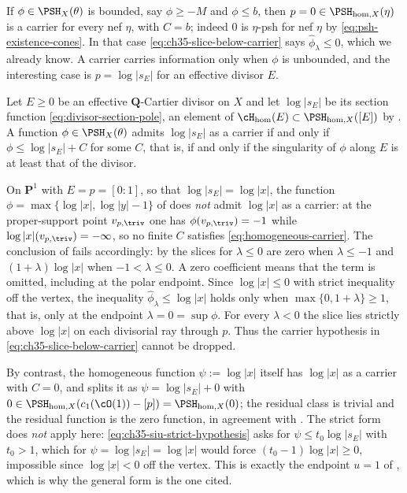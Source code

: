 \begin{example}
\label{ex:ch35-bounded-carrier}
If $\phi\in\PSH_X(\theta)$ is bounded, say $\phi\geq-M$ and
$\phi\leq b$, then $p=0\in\PSH_{\mathrm{hom},X}(\eta)$ is a carrier for
every nef $\eta$, with $C=b$; indeed $0$ is $\eta$-psh for nef
$\eta$ by \eqref{eq:psh-existence-cones}.  In that case
\eqref{eq:ch35-slice-below-carrier} says $\widehat\phi_\lambda\leq0$,
which we already know.  A carrier carries information only when $\phi$ is
unbounded, and the interesting case is $p=\log|s_E|$ for an effective
divisor $E$.
\end{example}

\begin{example}
\label{ex:ch35-divisorial-carrier}
Let $E\geq0$ be an effective $\mathbf Q$-Cartier divisor on $X$ and
let $\log|s_E|$ be its section function
\eqref{eq:divisor-section-pole}, an element of
$\cH_{\mathrm{hom}}(E)\subset\PSH_{\mathrm{hom},X}([E])$ by
.  A function
$\phi\in\PSH_X(\theta)$ admits $\log|s_E|$ as a carrier if and only if
$\phi\leq\log|s_E|+C$ for some $C$, that is, if and only if the
singularity of $\phi$ along $E$ is at least that of the divisor.

On $\mathbf P^1$ with $E=p=[0:1]$, so that $\log|s_E|=\log|x|$, the
function $\phi=\max\{\log|x|,\log|y|-1\}$ of
 does \emph{not} admit $\log|x|$ as a
carrier: at the proper-support point $v_{p,\triv}$ one has
$\phi(v_{p,\triv})=-1$ while $\log|x|(v_{p,\triv})=-\infty$, so no
finite $C$ satisfies \eqref{eq:homogeneous-carrier}.  The conclusion of
 fails accordingly: by
 the slices for $\lambda\leq0$ are zero when $\lambda\leq-1$ and
$(1+\lambda)\log|x|$ when $-1<\lambda\leq0$. A zero coefficient means
that the term is omitted, including at the polar endpoint. Since
$\log|x|\leq0$ with strict inequality off the vertex, the inequality
$\widehat\phi_\lambda\leq\log|x|$ holds only when
$\max\{0,1+\lambda\}\geq1$, that is, only at the endpoint
$\lambda=0=\sup\phi$.  For every $\lambda<0$ the slice lies strictly
above $\log|x|$ on each divisorial ray through $p$.  Thus the carrier
hypothesis in \eqref{eq:ch35-slice-below-carrier} cannot be dropped.

By contrast, the homogeneous function
$\psi:=\log|x|$ itself has $\log|x|$ as a carrier with $C=0$, and
 splits it as
$\psi=\log|s_E|+0$ with $0\in\PSH_{\mathrm{hom},X}(c_1(\cO(1))-[p])=
\PSH_{\mathrm{hom},X}(0)$; the residual class is trivial and the residual
function is the zero function, in agreement with
.  The strict form
 does \emph{not} apply here:
\eqref{eq:ch35-siu-strict-hypothesis} asks for
$\psi\leq t_0\log|s_E|$ with $t_0>1$, which for
$\psi=\log|s_E|=\log|x|$ would force $(t_0-1)\log|x|\geq0$, impossible
since $\log|x|<0$ off the vertex.  This is exactly the endpoint
$u=1$ of , which is why the general form is
the one cited.
\end{example}

